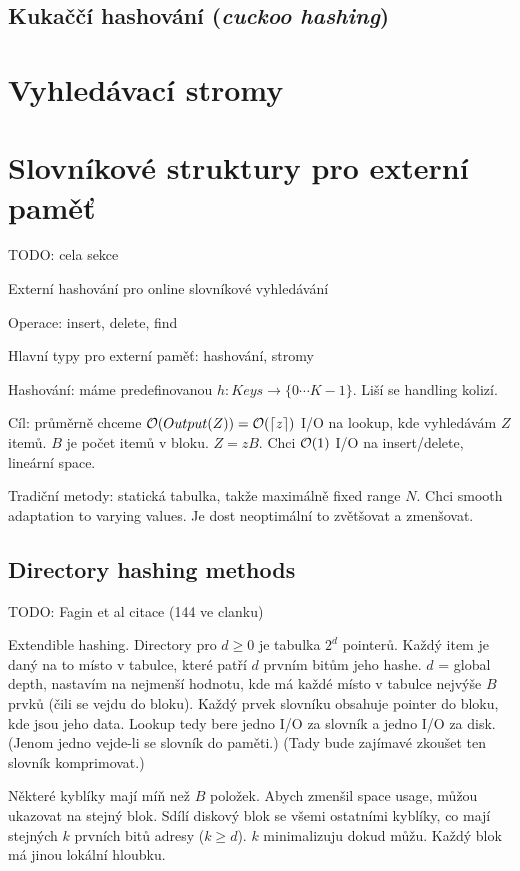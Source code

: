 \documentclass[a4paper]{article}
\begin{document}
\subsection{Kukaččí hashování (\textit{cuckoo hashing})}


\section{Vyhledávací stromy}

\section{Slovníkové struktury pro externí paměť}

TODO: cela sekce \cite{Vit}

Externí hashování pro online slovníkové vyhledávání

Operace: insert, delete, find

Hlavní typy pro externí paměť: hashování, stromy

Hashování: máme predefinovanou $h:Keys\rightarrow\{0\cdots K-1\}$.
Liší se handling kolizí.

Cíl: průměrně chceme $\mathcal{O}(Output(Z))=\mathcal{O}(\lceil z\rceil)$
I/O na lookup, kde vyhledávám $Z$ itemů. $B$ je počet itemů v bloku.
$Z=zB$. Chci $\mathcal{O}(1)$ I/O na insert/delete, lineární space.

Tradiční metody: statická tabulka, takže maximálně fixed range $N$.
Chci smooth adaptation to varying values. Je dost neoptimální
to zvětšovat a zmenšovat.

\subsection{Directory hashing methods}
TODO: Fagin et al citace (144 ve clanku)

Extendible hashing.
Directory pro $d\geq 0$ je tabulka $2^d$ pointerů.
Každý item je daný na to místo v tabulce, které patří $d$ prvním bitům jeho
hashe.
$d$ = global depth, nastavím na nejmenší hodnotu, kde má každé místo v tabulce
nejvýše $B$ prvků (čili se vejdu do bloku).
Každý prvek slovníku obsahuje pointer do bloku, kde jsou jeho data.
Lookup tedy bere jedno I/O za slovník a jedno I/O za disk. (Jenom jedno vejde-li
se slovník do paměti.)
(Tady bude zajímavé zkoušet ten slovník komprimovat.)

Některé kyblíky mají míň než $B$ položek. Abych zmenšil space usage, můžou
ukazovat na stejný blok.
Sdílí diskový blok se všemi ostatními kyblíky, co mají stejných $k$ prvních bitů
adresy ($k\geq d$). $k$ minimalizuju dokud můžu. Každý blok má jinou lokální
hloubku.
\end{document}
